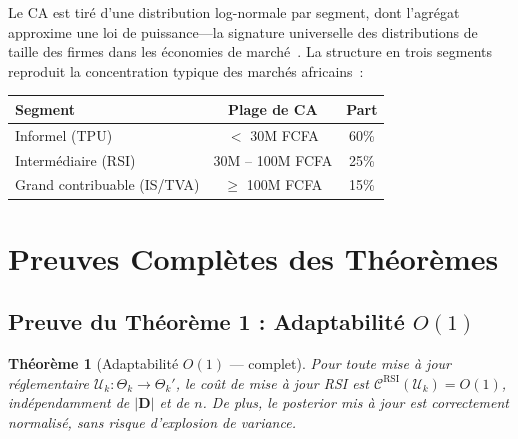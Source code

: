 \documentclass[letterpaper]{article}
\newtheorem{theoreme}{Th\'eor\`eme}
\begin{document}
Le CA est tir\'e d'une distribution log-normale par segment, dont
l'agr\'egat approxime une loi de puissance---la signature universelle
des distributions de taille des firmes dans les \'economies de
march\'e~\cite{gabaix2009power}. La structure en trois segments
reproduit la concentration typique des march\'es africains~:

\begin{center}
\begin{tabular}{lcc}
\toprule
\textbf{Segment} & \textbf{Plage de CA} & \textbf{Part} \\
\midrule
Informel (TPU) & $<$ 30M FCFA & 60\% \\
Interm\'ediaire (RSI) & 30M -- 100M FCFA & 25\% \\
Grand contribuable (IS/TVA) & $\geq$ 100M FCFA & 15\% \\
\bottomrule
\end{tabular}
\end{center}

\section{Preuves Compl\`etes des Th\'eor\`emes}
\label{app:preuves}

\subsection{Preuve du Th\'eor\`eme 1 : Adaptabilit\'e $O(1)$}

\begin{theoreme}[Adaptabilit\'e $O(1)$ --- complet]
Pour toute mise \`a jour r\'eglementaire $\mathcal{U}_k : \Theta_k
\to \Theta_k'$, le co\^ut de mise \`a jour RSI est
$\mathcal{C}^{\text{RSI}}(\mathcal{U}_k) = O(1)$, ind\'ependamment
de $|\mathbf{D}|$ et de $n$. De plus, le posterior mis \`a jour est
correctement normalis\'e, sans risque d'explosion de variance.
\end{theoreme}
\end{document}

